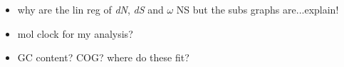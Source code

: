 \documentclass[12pt]{article}
\newcommand{\strep}{\textit{Streptomyces}\xspace}
\newcommand{\dn}{\textit{dN}\xspace}
\newcommand{\ds}{\textit{dS}\xspace}
\begin{document}
\begin{itemize}
%		

%    
%    
%    
%    
%	
%	
%	
%	
%	
%	
	\item why are the lin reg of \dn, \ds and $\omega$ NS but the subs graphs are...explain!
%	
	
	\item mol clock for my analysis?
	
	\item GC content? COG? where do these fit?
	
\end{itemize}
\end{document}
